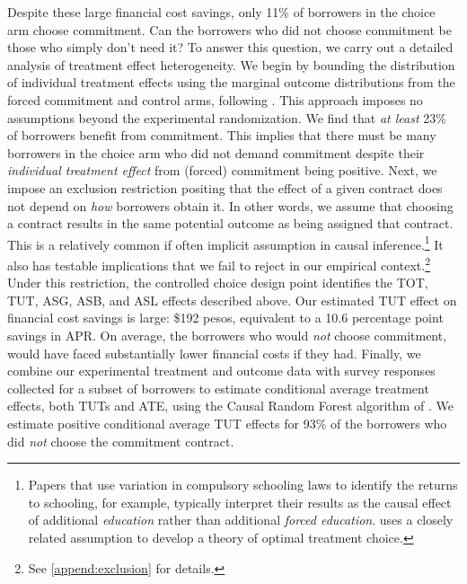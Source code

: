 \documentclass[ecta,nameyear,final]{econsocart}
\begin{document}
Despite these large financial cost savings, only 11\% of borrowers in the choice arm choose commitment. 
Can the borrowers who did not choose commitment be those who simply don't need it? 
To answer this question, we carry out a detailed analysis of treatment effect heterogeneity.
We begin by bounding the distribution of individual treatment effects using the marginal outcome distributions from the forced commitment and control arms, following \cite{fan2010sharp}. This approach imposes no assumptions beyond the experimental randomization. We find that \textit{at least} 23\% of borrowers benefit from commitment. This implies that there must be many borrowers in the choice arm who did not demand commitment despite their \emph{individual treatment effect} from (forced) commitment being positive. Next, we impose an exclusion restriction positing that the effect of a given contract does not depend on \emph{how} borrowers obtain it. In other words, we assume that choosing a contract results in the same potential outcome as being assigned that contract. This is a relatively common if often implicit assumption in causal inference.\footnote{Papers that use variation in compulsory schooling laws to identify the returns to schooling, for example, typically interpret their results as the causal effect of additional \emph{education} rather than additional \emph{forced education}. \cite{chamberlain2011bayesian} uses a closely related assumption to develop a theory of optimal treatment choice.} 
It also has testable implications that we fail to reject in our empirical context.\footnote{See \ref{append:exclusion} for details.}
Under this restriction, the controlled choice design point identifies the TOT, TUT, ASG, ASB, and ASL effects described above.  Our estimated TUT effect on financial cost savings is large: \$192 pesos, equivalent to a 10.6 percentage point savings in APR. On average, the borrowers who would \textit{not} choose commitment, would have faced substantially lower financial costs if they had. Finally, we combine our experimental treatment and outcome data with survey responses collected for a subset of borrowers to estimate conditional average treatment effects, both TUTs and ATE, using the Causal Random Forest algorithm of \cite{atheygrf}. We estimate positive conditional average TUT effects for 93\% of the borrowers who did \textit{not} choose the commitment contract. 
\end{document}
